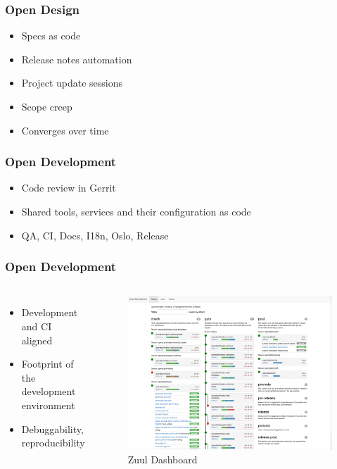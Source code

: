 \documentclass[aspectratio=169,11pt,hyperref={colorlinks=true}]{beamer}
\begin{document}
\begin{frame}
  \frametitle{Open Design}
    \begin{itemize}
        \item{Specs as code}
        \item{Release notes automation}
        \item{Project update sessions}
    \end{itemize}
    \begin{itemize}
        \item{Scope creep}
        \item{Converges over time}
    \end{itemize}
\end{frame}

\begin{frame}
  \frametitle{Open Development}
    \begin{itemize}
        \item{Code review in Gerrit}
        \item{Shared tools, services and their configuration as code}
        \item{QA, CI, Docs, I18n, Oslo, Release}
    \end{itemize}
\end{frame}

\begin{frame}
  \frametitle{Open Development}
    \begin{columns}
        \begin{itemize}
            \item{Development and CI aligned}
            \item{Footprint of the development environment}
            \item{Debuggability, reproducibility}
        \end{itemize}
          \begin{figure}
            \includegraphics[width=1\textwidth]{pictures/zuul_dashboard.png}
            \caption{Zuul Dashboard}
          \end{figure}
    \end{columns}
\end{frame}
\end{document}
